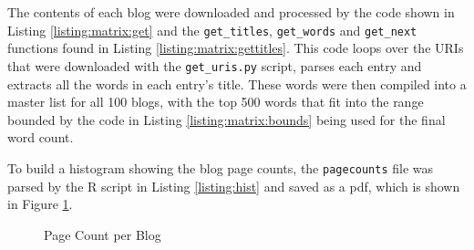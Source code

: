 The contents of each blog were downloaded and processed by the code shown in Listing \ref{listing:matrix:get} and the {\tt get\_titles}, {\tt get\_words} and {\tt get\_next} functions found in Listing \ref{listing:matrix:gettitles}. This code loops over the URIs that were downloaded with the {\tt get\_uris.py} script, parses each entry and extracts all the words in each entry's title. These words were then compiled into a master list for all 100 blogs, with the top 500 words that fit into the range bounded by the code in Listing \ref{listing:matrix:bounds} being used for the final word count. 



\clearpage





To build a histogram showing the blog page counts, the {\tt pagecounts} file was parsed by the R script in Listing \ref{listing:hist} and saved as a pdf, which is shown in Figure \ref{fig:hist}.



\clearpage

\begin{figure}[h!]
\centering
{}
\caption{Page Count per Blog}
\label{fig:hist}
\end{figure}


% 